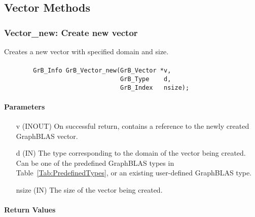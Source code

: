 \subsection{Vector Methods}

\subsubsection{{\sf Vector\_new}: Create new vector}

Creates a new vector with specified domain and size.

\paragraph{\syntax}

\begin{verbatim}
        GrB_Info GrB_Vector_new(GrB_Vector *v,
                                GrB_Type    d,
                                GrB_Index   nsize);
\end{verbatim}

\paragraph{Parameters}

\begin{itemize}[leftmargin=1.1in]
    \item[{\sf v}] ({\sf INOUT}) On successful return, contains a reference
                                 to the newly created GraphBLAS vector.
    \item[{\sf d}] ({\sf IN})    The type corresponding to the domain of the 
                                 vector being created.  Can be one of the 
                                 predefined GraphBLAS types in 
                                 Table~\ref{Tab:PredefinedTypes}, or an existing 
                                 user-defined GraphBLAS type.
    \item[{\sf nsize}] ({\sf IN}) The size of the vector being created.
\end{itemize}

\paragraph{Return Values}

